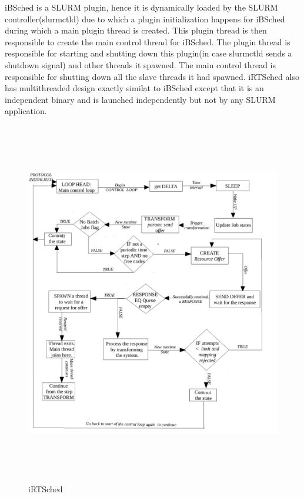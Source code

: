 \noindent
iBSched is a SLURM plugin, hence it is dynamically loaded by the SLURM controller(slurmctld) due to which a plugin initialization happens for iBSched during which a main plugin thread is created. This plugin thread is then responsible to create the main control thread for iBSched. The plugin thread is responsible for starting and shutting down this plugin(in case slurmctld sends a shutdown signal) and other threads it spawned. The main control thread is responsible for shutting down all the slave threads it had spawned. iRTSched also has multithreaded design exactly similat to iBSched except that it is an independent binary and is launched independently but not by any SLURM application.
\begin{figure}[!htbp]
\centering
\includegraphics[width=1.0\textwidth, height=160mm]{./figures/iRTSched.pdf}
\caption{iRTSched}
\label{fig:Neg1}
\end{figure}
